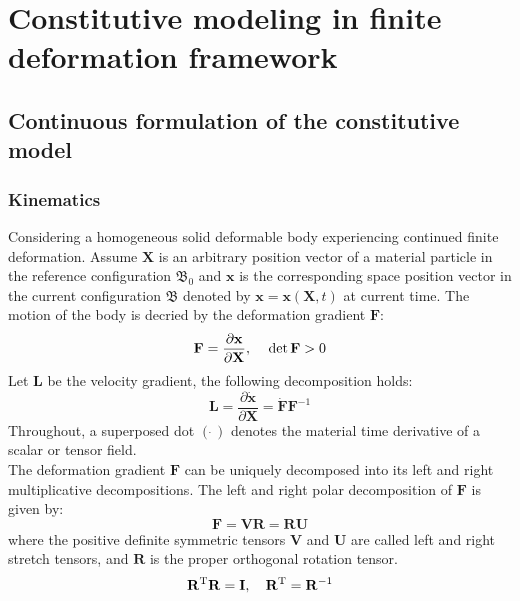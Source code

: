 \chapter{Constitutive modeling in finite deformation framework}

\section{Continuous formulation of the constitutive model}
\label{}
\subsection{Kinematics}
Considering a homogeneous solid deformable body experiencing continued finite deformation.
Assume $\mathbf{X}$ is an arbitrary position vector of a material particle in the reference configuration $\mathfrak{B_0}$ and $\mathbf{x}$ is the corresponding space position vector in the current configuration $\mathfrak{B}$ denoted by $\mathbf{x}=\mathbf{x}\left(\mathbf{X},t\right)$ at current time.
The motion of the body is decried by the deformation gradient $\mathbf{F}$:
\begin{equation}
{\mathbf{F}} = \frac{{\partial {\mathbf{x}}}}{{\partial {\mathbf{X}}}}, \rm{\quad} \det {\mathbf{F}}>0
\end{equation}
Let $\mathbf{L}$ be the velocity gradient, the following decomposition holds:
\begin{equation}
{\mathbf{L}} = \frac{{\partial {\mathbf{\dot x}}}}{{\partial {\mathbf{X}}}} = {\mathbf{\dot F}}{{\mathbf{F}}^{ - 1}}
\end{equation}
Throughout, a superposed dot $\left(\dot{\ }\right)$ denotes the material time derivative of a scalar or tensor field.\\
The deformation gradient $\mathbf{F}$ can be uniquely decomposed into its left and right multiplicative decompositions.
The left and right polar decomposition of $\mathbf{F}$ is given by:
\begin{equation}
{\mathbf{F}} = {\mathbf{VR}} = {\mathbf{RU}}
\end{equation}
where the positive definite symmetric tensors $\mathbf{V}$ and $\mathbf{U}$ are called left and right stretch tensors, and $\mathbf{R}$ is the proper orthogonal rotation tensor.
\begin{equation}
{{\mathbf{R}}^{\rm{T}}} {\mathbf{R}} = {\mathbf{I}}, \rm{\quad} {{\mathbf{R}}^{\rm{T}}} = {{\mathbf{R}}^{ - 1}}
\end{equation}
